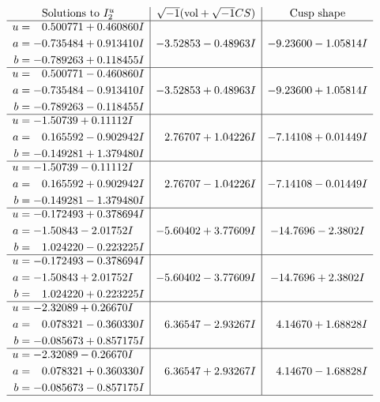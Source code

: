 \documentclass[1p]{elsarticle_modified}
\theoremstyle{definition}
\newcommand{\I}{\sqrt{-1}}
\begin{document}
$$\begin{array}{c|c|c}  
\text{Solutions to }I^u_{2}& \I (\text{vol} + \sqrt{-1}CS) & \text{Cusp shape}\\
 \hline 
\begin{aligned}
u &= \phantom{-}0.500771 + 0.460860 I \\
a &= -0.735484 + 0.913410 I \\
b &= -0.789263 + 0.118455 I\end{aligned}
 & -3.52853 - 0.48963 I & -9.23600 - 1.05814 I \\ \hline\begin{aligned}
u &= \phantom{-}0.500771 - 0.460860 I \\
a &= -0.735484 - 0.913410 I \\
b &= -0.789263 - 0.118455 I\end{aligned}
 & -3.52853 + 0.48963 I & -9.23600 + 1.05814 I \\ \hline\begin{aligned}
u &= -1.50739 + 0.11112 I \\
a &= \phantom{-}0.165592 - 0.902942 I \\
b &= -0.149281 + 1.379480 I\end{aligned}
 & \phantom{-}2.76707 + 1.04226 I & -7.14108 + 0.01449 I \\ \hline\begin{aligned}
u &= -1.50739 - 0.11112 I \\
a &= \phantom{-}0.165592 + 0.902942 I \\
b &= -0.149281 - 1.379480 I\end{aligned}
 & \phantom{-}2.76707 - 1.04226 I & -7.14108 - 0.01449 I \\ \hline\begin{aligned}
u &= -0.172493 + 0.378694 I \\
a &= -1.50843 - 2.01752 I \\
b &= \phantom{-}1.024220 - 0.223225 I\end{aligned}
 & -5.60402 + 3.77609 I & -14.7696 - 2.3802 I \\ \hline\begin{aligned}
u &= -0.172493 - 0.378694 I \\
a &= -1.50843 + 2.01752 I \\
b &= \phantom{-}1.024220 + 0.223225 I\end{aligned}
 & -5.60402 - 3.77609 I & -14.7696 + 2.3802 I \\ \hline\begin{aligned}
u &= -2.32089 + 0.26670 I \\
a &= \phantom{-}0.078321 - 0.360330 I \\
b &= -0.085673 + 0.857175 I\end{aligned}
 & \phantom{-}6.36547 - 2.93267 I & \phantom{-}4.14670 + 1.68828 I \\ \hline\begin{aligned}
u &= -2.32089 - 0.26670 I \\
a &= \phantom{-}0.078321 + 0.360330 I \\
b &= -0.085673 - 0.857175 I\end{aligned}
 & \phantom{-}6.36547 + 2.93267 I & \phantom{-}4.14670 - 1.68828 I\\
 \hline 
 \end{array}$$\newpage
\end{document}
